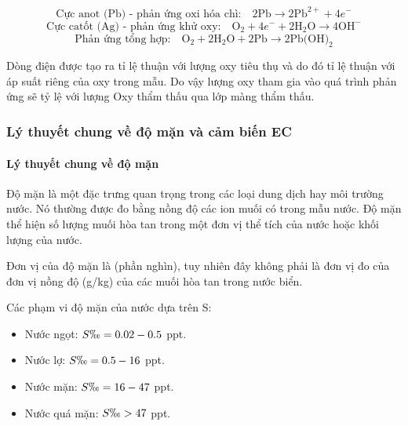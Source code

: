\documentclass{article} %
\begin{document}
	\begin{equation}
		\text{Cực anot (Pb) - phản ứng oxi hóa chì:} \quad 2\text{Pb} \rightarrow 2\text{Pb}^{2+} + 4e^-
	\end{equation}
	\begin{equation}
		\text{Cực catốt (Ag) - phản ứng khử oxy:} \quad \text{O}_2 + 4e^- + 2\text{H}_2\text{O} \rightarrow 4\text{OH}^-
	\end{equation}
	\begin{equation}
		\text{Phản ứng tổng hợp:} \quad \text{O}_2 + 2\text{H}_2\text{O} + 2\text{Pb} \rightarrow 2\text{Pb(OH)}_2
	\end{equation}
	
	Dòng điện được tạo ra tỉ lệ thuận với lượng oxy tiêu thụ và do đó tỉ lệ thuận với áp suất riêng của oxy trong mẫu. Do vậy lượng oxy tham gia vào quá trình phản ứng sẽ tỷ lệ với lượng Oxy thẩm thấu qua lớp màng thẩm thấu.
	
	\subsubsection{Lý thuyết chung về độ mặn và cảm biến EC}
	\paragraph{Lý thuyết chung về độ mặn }\mbox{}
	
	Độ mặn là một đặc trưng quan trọng trong các loại dung dịch hay môi trường nước. Nó thường được đo bằng nồng độ các ion muối có trong mẫu nước. Độ mặn thể hiện số lượng muối hòa tan trong một đơn vị thể tích của nước hoặc khối lượng của nước.
	
	Đơn vị của độ mặn là \text{\permil} (phần nghìn), tuy nhiên đây không phải là đơn vị đo của đơn vị nồng độ (g/kg) của các muối hòa tan trong nước biển.
	
	Các phạm vi độ mặn của nước dựa trên S\permil:
	\begin{itemize}
		\item Nước ngọt: \( S\permil = 0.02 - 0.5 \) ppt.
		\item Nước lợ: \( S\permil = 0.5 - 16 \) ppt.
		\item Nước mặn: \( S\permil = 16 - 47 \) ppt.
		\item Nước quá mặn: \( S\permil > 47 \) ppt.
	\end{itemize}
	
\end{document}

